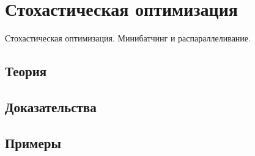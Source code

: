 
\section{Стохастическая оптимизация}
\label{sec:2.4.17-stochastic-optimization}

\begin{ticket}
Стохастическая оптимизация. Минибатчинг и распараллеливание.
\end{ticket}

\subsection*{Теория}

\subsection*{Доказательства}

\subsection*{Примеры}
